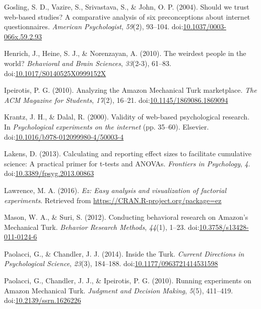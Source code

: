\documentclass[english,man]{apa6}
\theoremstyle{definition}
\theoremstyle{definition}
\theoremstyle{definition}
\theoremstyle{remark}
\begin{document}
\hypertarget{ref-Gosling2004}{}
Gosling, S. D., Vazire, S., Srivastava, S., \& John, O. P. (2004).
Should we trust web-based studies? A comparative analysis of six
preconceptions about internet questionnaires. \emph{American
Psychologist}, \emph{59}(2), 93--104.
doi:\href{https://doi.org/10.1037/0003-066x.59.2.93}{10.1037/0003-066x.59.2.93}

\hypertarget{ref-Henrich2010}{}
Henrich, J., Heine, S. J., \& Norenzayan, A. (2010). The weirdest people
in the world? \emph{Behavioral and Brain Sciences}, \emph{33}(2-3),
61--83.
doi:\href{https://doi.org/10.1017/S0140525X0999152X}{10.1017/S0140525X0999152X}

\hypertarget{ref-Ipeirotis2010}{}
Ipeirotis, P. G. (2010). Analyzing the Amazon Mechanical Turk
marketplace. \emph{The ACM Magazine for Students}, \emph{17}(2), 16--21.
doi:\href{https://doi.org/10.1145/1869086.1869094}{10.1145/1869086.1869094}

\hypertarget{ref-Krantz2000}{}
Krantz, J. H., \& Dalal, R. (2000). Validity of web-based psychological
research. In \emph{Psychological experiments on the internet} (pp.
35--60). Elsevier.
doi:\href{https://doi.org/10.1016/b978-012099980-4/50003-4}{10.1016/b978-012099980-4/50003-4}

\hypertarget{ref-Lakens2013}{}
Lakens, D. (2013). Calculating and reporting effect sizes to facilitate
cumulative science: A practical primer for t-tests and ANOVAs.
\emph{Frontiers in Psychology}, \emph{4}.
doi:\href{https://doi.org/10.3389/fpsyg.2013.00863}{10.3389/fpsyg.2013.00863}

\hypertarget{ref-Lawrence2016}{}
Lawrence, M. A. (2016). \emph{Ez: Easy analysis and visualization of
factorial experiments}. Retrieved from
\url{https://CRAN.R-project.org/package=ez}

\hypertarget{ref-Mason2012}{}
Mason, W. A., \& Suri, S. (2012). Conducting behavioral research on
Amazon's Mechanical Turk. \emph{Behavior Research Methods},
\emph{44}(1), 1--23.
doi:\href{https://doi.org/10.3758/s13428-011-0124-6}{10.3758/s13428-011-0124-6}

\hypertarget{ref-Paolacci2014}{}
Paolacci, G., \& Chandler, J. J. (2014). Inside the Turk. \emph{Current
Directions in Psychological Science}, \emph{23}(3), 184--188.
doi:\href{https://doi.org/10.1177/0963721414531598}{10.1177/0963721414531598}

\hypertarget{ref-Paolacci2010}{}
Paolacci, G., Chandler, J. J., \& Ipeirotis, P. G. (2010). Running
experiments on Amazon Mechanical Turk. \emph{Judgment and Decision
Making}, \emph{5}(5), 411--419.
doi:\href{https://doi.org/10.2139/ssrn.1626226}{10.2139/ssrn.1626226}
\end{document}

